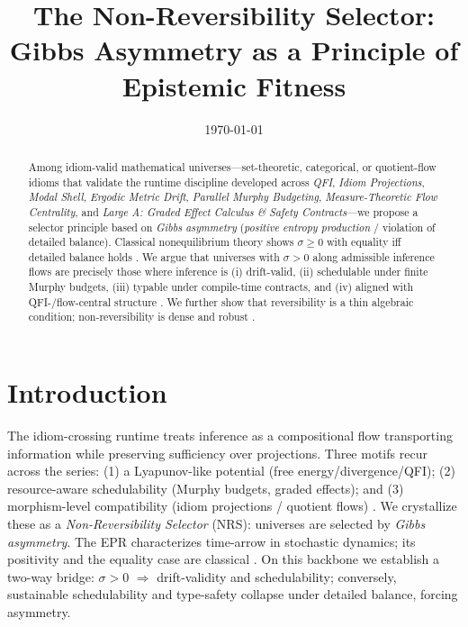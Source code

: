 \documentclass[11pt]{article}
\title{\textbf{The Non-Reversibility Selector:}\\[0.25em] Gibbs Asymmetry as a Principle of Epistemic Fitness}
\author{}
\date{\today}
\theoremstyle{plain}
\theoremstyle{definition}
\theoremstyle{remark}
\newcommand{\1}{\mathds{1}}
\newcommand{\EP}{\sigma} %
\begin{document}
\maketitle

\begin{abstract}
Among idiom-valid mathematical universes—set-theoretic, categorical, or quotient-flow idioms that validate the runtime discipline developed across \emph{QFI}, \emph{Idiom Projections}, \emph{Modal Shell}, \emph{Ergodic Metric Drift}, \emph{Parallel Murphy Budgeting}, \emph{Measure-Theoretic Flow Centrality}, and \emph{Large A: Graded Effect Calculus \& Safety Contracts}—we propose a selector principle based on \emph{Gibbs asymmetry} (\emph{positive entropy production} / violation of detailed balance). Classical nonequilibrium theory shows $\EP\ge 0$ with equality iff detailed balance holds \cite{Schnakenberg1976,LebowitzSpohn1999,Seifert2012,MaesNetocny2003}. 
We argue that universes with $\EP>0$ along admissible inference flows are precisely those where inference is (i) drift-valid, (ii) schedulable under finite Murphy budgets, (iii) typable under compile-time contracts, and (iv) aligned with QFI-/flow-central structure \cite{QFI2025,IdiomProjections2025,ModalShell2025,ErgodicDrift2025,MurphyBudget2025,FlowCentrality2025,GradedEffects2025,MeasureContracts2025}. We further show that reversibility is a thin algebraic condition; non-reversibility is dense and robust \cite{BochnakCosteRoy1998}.
\end{abstract}

\section{Introduction}
The idiom-crossing runtime treats inference as a compositional flow transporting information while preserving sufficiency over projections. Three motifs recur across the series: (1) a Lyapunov-like potential (free energy/divergence/QFI); (2) resource-aware schedulability (Murphy budgets, graded effects); and (3) morphism-level compatibility (idiom projections / quotient flows) \cite{QFI2025,IdiomProjections2025,ModalShell2025,GradedEffects2025}. 
We crystallize these as a \emph{Non-Reversibility Selector} (NRS): universes are selected by \emph{Gibbs asymmetry}. The EPR characterizes time-arrow in stochastic dynamics; its positivity and the equality case are classical \cite{Schnakenberg1976,LebowitzSpohn1999,Seifert2012}. On this backbone we establish a two-way bridge: $\EP>0$ $\Rightarrow$ drift-validity and schedulability; conversely, sustainable schedulability and type-safety collapse under detailed balance, forcing asymmetry.
\end{document}
